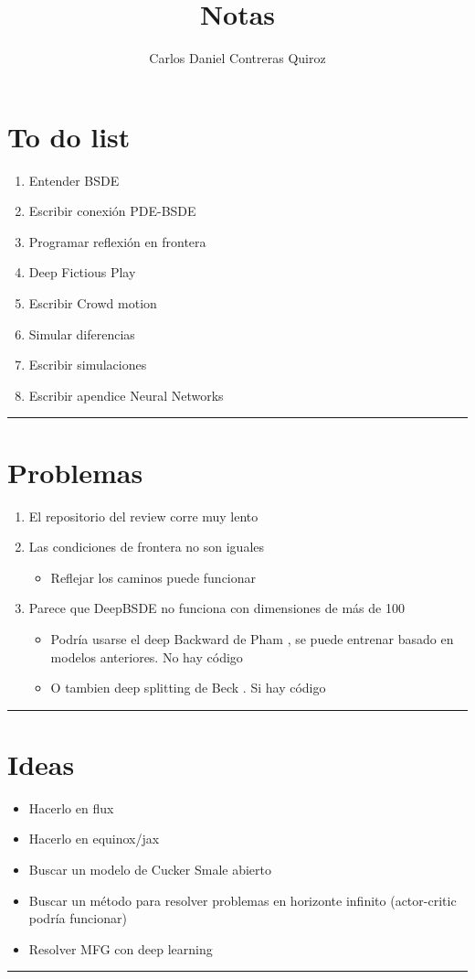 \documentclass{article}
\title{Notas}
\author{Carlos Daniel Contreras Quiroz}
\newcommand{\HRule}{\rule{\linewidth}{0.5mm}}
\begin{document}
	\maketitle%
	\vspace{5mm}
	\section*{To do list}
	\begin{enumerate}
		\item Entender BSDE 
		\item Escribir conexión PDE-BSDE
		\item Programar reflexión en frontera
		\item Deep Fictious Play
		\item Escribir Crowd motion
		\item Simular diferencias
		\item Escribir simulaciones
		\item Escribir apendice Neural Networks
	\end{enumerate}
    \HRule\par
	\section*{Problemas}
	\begin{enumerate}
		\item El repositorio del review corre muy lento \bluecheck
		\item Las condiciones de frontera no son iguales
		\begin{itemize}
			\item Reflejar los caminos puede funcionar \redwrong
		\end{itemize}
		\item Parece que DeepBSDE no funciona con dimensiones de más de 100
		\begin{itemize}
			\item Podría usarse el deep Backward de Pham \cite{hure_deep_2020}, se puede entrenar basado en modelos anteriores. No hay código
			\item O tambien deep splitting de Beck \cite{beck_deep_2021}. Si hay código
		\end{itemize}
	\end{enumerate}
    \HRule\par
    \section*{Ideas}
    \begin{itemize}
    	\item Hacerlo en flux
    	\item Hacerlo en equinox/jax
    	\item Buscar un modelo de Cucker Smale abierto
    	\item Buscar un método para resolver problemas en horizonte infinito (actor-critic podría funcionar)
    	\item Resolver MFG con deep learning
    \end{itemize}
    \HRule\par
\end{document}
